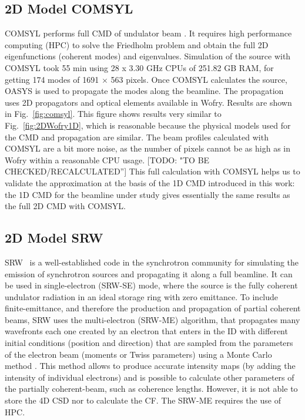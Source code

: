 \documentclass{iucr}              %
\newcommand{\todo}[1]{{\color{red}[TODO: "#1'']}}
\newcommand{\inred}[1]{{\color{red}#1}}
\begin{document}
\subsection{2D Model COMSYL}
COMSYL performs full CMD of undulator beam \cite{glass2017}. It requires high performance computing (HPC) to solve the Friedholm problem and obtain the full 2D eigenfunctions (coherent modes) and eigenvalues.
Simulation of the source with COMSYL took 55 min using  
28 x 3.30 GHz CPUs of 251.82 GB RAM, for getting 174 modes of 1691 $\times$ 563 pixels.
Once COMSYL calculates the source, OASYS is used to propagate the modes along the beamline.
The propagation uses 2D propagators and optical elements available in Wofry. Results are shown in Fig.~\ref{fig:comsyl}. This figure shows results very similar to Fig.~\ref{fig:2DWofry1D}, which is reasonable because the physical models used for the CMD and propagation are similar. \inred{The beam profiles calculated with COMSYL are a bit more noise, as the number of pixels cannot be as high as in Wofry within a reasonable CPU usage.} \todo{TO BE CHECKED/RECALCULATED} This full calculation with COMSYL helps us to validate the approximation at the basis of the 1D CMD introduced in this work: the 1D CMD for the beamline under study gives essentially the same results as the full 2D CMD with COMSYL.



\subsection{2D Model SRW}
SRW~\cite{codeSRW} is a well-established code in the synchrotron community for simulating the emission of synchrotron sources and propagating it along a full beamline. It can be used in single-electron (SRW-SE) mode, where the source is the fully coherent undulator radiation in an ideal storage ring with zero emittance. To include finite-emittance, and therefore the production and propagation of partial coherent beams, SRW uses the multi-electron (SRW-ME) algorithm, that propagates many wavefronts each one created by an electron that enters in the ID with different initial conditions (position and direction) that are sampled from the parameters of the electron beam (moments or Twiss parameters) using a Monte Carlo method \cite{codeSRW_ME}. This method allows to produce accurate intensity maps (by adding the intensity of individual electrons) and is possible to calculate other parameters of the partially coherent-beam, such as coherence lengths. However, it is not able to store the 4D CSD nor to calculate the CF. The SRW-ME requires the use of HPC. 
\end{document}
